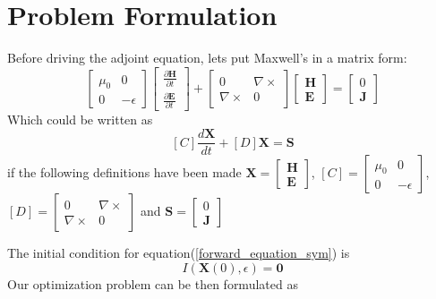 \documentclass{tufte-handout}
\begin{document}
 \section{Problem Formulation}
 Before driving the adjoint equation, lets put Maxwell's in a matrix form:
 \begin{equation}
 \begin{bmatrix} 
 \mu_0 & 0 \\
 0 & -\epsilon
 \end{bmatrix}  \begin{bmatrix} 
 \frac{\partial \mathbf{H}}{\partial t}  \\
  \frac{\partial \mathbf{E}}{\partial t}
 \end{bmatrix} +\begin{bmatrix} 
 0 & \nabla \times \\
 \nabla \times & 0 
 \end{bmatrix}  \begin{bmatrix} 
 \mathbf{H}  \\
 \mathbf{E} 
 \end{bmatrix} = \begin{bmatrix} 
 0 \\
 \mathbf{J} 
 \end{bmatrix}
 \end{equation}
 Which could be written as
 \begin{equation}\label{forward_equation_sym}
[C] \frac{d \mathbf{X}}{dt} + [D] \mathbf{X} = \mathbf{S}
 \end{equation} 
 if the following definitions have been made $\mathbf{X} = \begin{bmatrix} 
 \mathbf{H}  \\
 \mathbf{E} 
 \end{bmatrix} $, $[C] = \begin{bmatrix} 
 \mu_0 & 0 \\
 0 & -\epsilon
 \end{bmatrix}$, $[D] = \begin{bmatrix} 
 0 & \nabla \times \\
 \nabla \times & 0 
 \end{bmatrix}  $ and $\mathbf{S} = \begin{bmatrix} 
 0 \\
 \mathbf{J} 
 \end{bmatrix} $
 
 The initial condition for equation(\ref{forward_equation_sym}) is \begin{equation}
I(\mathbf{X}(0),\epsilon) = \mathbf{0}
 \end{equation}
 Our optimization problem can  be then formulated as
  
\end{document}
